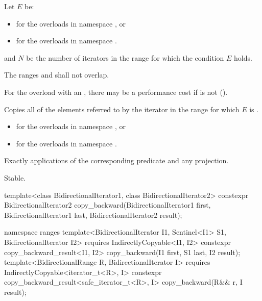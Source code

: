 \begin{itemdescr}
\pnum
Let $E$ be:
\begin{itemize}
\item {} for the overloads in namespace , or
\item {} for the overloads in
  namespace .
\end{itemize}
and $N$ be the number of iterators  in the range 
for which the condition $E$ holds.

\pnum
\requires The ranges  and  shall not overlap.
\begin{note}
For the overload with an , there may be a performance
cost if  is not
 ().
\end{note}

\pnum
\effects Copies all of the elements referred to by the iterator  in the range 
for which $E$ is .

\pnum
\returns
\begin{itemize}
\item {} for the overloads in namespace , or
\item {}
  for the overloads in namespace .
\end{itemize}

\pnum
\complexity Exactly  applications of the corresponding predicate and any projection.

\pnum
\remarks Stable.
\end{itemdescr}

%
\begin{itemdecl}
template<class BidirectionalIterator1, class BidirectionalIterator2>
  constexpr BidirectionalIterator2
    copy_backward(BidirectionalIterator1 first,
                  BidirectionalIterator1 last,
                  BidirectionalIterator2 result);

namespace ranges {
  template<BidirectionalIterator I1, Sentinel<I1> S1, BidirectionalIterator I2>
    requires IndirectlyCopyable<I1, I2>
    constexpr copy_backward_result<I1, I2>
      copy_backward(I1 first, S1 last, I2 result);
  template<BidirectionalRange R, BidirectionalIterator I>
    requires IndirectlyCopyable<iterator_t<R>, I>
    constexpr copy_backward_result<safe_iterator_t<R>, I>
      copy_backward(R&& r, I result);
}
\end{itemdecl}

